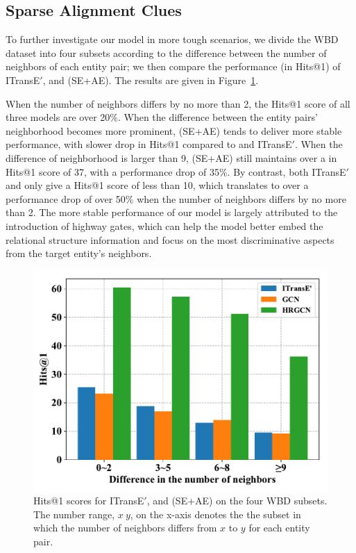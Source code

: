 \subsection{Sparse Alignment Clues}
To further investigate our model in more tough scenarios,
we divide the WBD dataset into four subsets according to the difference between the number of neighbors of each entity pair; we then compare the performance (in Hits@1) of ITransE$'$,  \GCN and \HRGCN (SE+AE). %
The results are given in Figure~\ref{subset}.

When the number of neighbors differs by no more than 2, the Hits@1 score of all three models are over 20\%. When the difference between the
entity pairs' neighborhood becomes more prominent, \HRGCN (SE+AE) tends to deliver more stable performance, with slower drop in Hits@1
compared to \GCN and ITransE$'$. When the difference of neighborhood is larger than 9, \HRGCN (SE+AE) still maintains over a in Hits@1
score of 37, with a performance drop of 35\%. By contrast, both ITransE$'$ and \GCN only give a Hits@1 score of less than 10, which
translates to over a performance drop of over 50\% when the number of neighbors differs by no more than 2. The more stable performance of
our \HRGCN model is largely attributed to the introduction of highway gates, which can help the model better embed the relational structure
information and focus on the most discriminative aspects from the target entity's neighbors.


\begin{figure}
	\centering
	\includegraphics[width=1\linewidth]{figures/graph4.pdf}
	\caption{Hits@1 scores for ITransE$'$, \GCN and \HRGCN (SE+AE) on the four WBD subsets. The number range, $x~y$, on the
x-axis denotes the the subset in which the number of neighbors differs from $x$ to $y$ for each entity pair.}
	\label{subset}
\end{figure}

